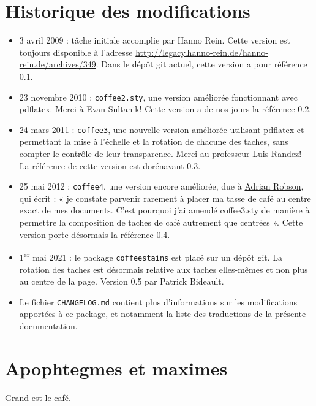 \documentclass[a4paper, 11pt, BCOR = 0 pt, DIV = 13, oneside, french]{scrartcl}
\begin{document}
\section{Historique des modifications}
\begin{itemize}
\item 3 avril 2009 : tâche initiale accomplie par Hanno Rein. Cette version est
  toujours disponible à l'adresse
  \url{http://legacy.hanno-rein.de/hanno-rein.de/archives/349}. Dans le dépôt
  git actuel, cette version a pour référence 0.1.
\item 23 novembre 2010 : \texttt{coffee2.sty}, une version améliorée fonctionnant
  avec pdflatex. Merci à \href{http://www.sultanik.com/}{Evan Sultanik}! Cette
  version a de nos jours la référence 0.2.
\item 24 mars 2011 : \texttt{coffee3}, une nouvelle version améliorée utilisant
  pdflatex et permettant la mise à l'échelle et la rotation de chacune des
  taches, sans compter le contrôle de leur transparence. Merci au \href{http://pcmap.unizar.es/~pilar/}{professeur Luis
    Randez}! La référence de cette version est dorénavant 0.3.
\item 25 mai 2012 : \texttt{coffee4}, une version encore améliorée, due à
  \href{http://nepsweb.co.uk/homeapr/}{Adrian Robson}, qui écrit : « je constate
  parvenir rarement à placer ma tasse de café au centre exact de mes documents.
  C'est pourquoi j'ai amendé coffee3.sty de manière à permettre la composition
  de taches de café autrement que centrées ». Cette
  version porte désormais la référence 0.4.
\item 1\textsuperscript{er} mai 2021 : le package \texttt{coffeestains} est
  placé sur un dépôt git. La rotation des taches est désormais relative aux
  taches elles-mêmes et non plus au centre de la page. Version 0.5 par Patrick Bideault.
\item Le fichier \texttt{CHANGELOG.md} contient plus d'informations sur les
  modifications apportées à ce package, et notamment la liste des traductions de
  la présente documentation.
\end{itemize}
\label{stainC}

\section{Apophtegmes et maximes}
\noindent
Grand est le café.

\vspace{5mm}
\end{document}
